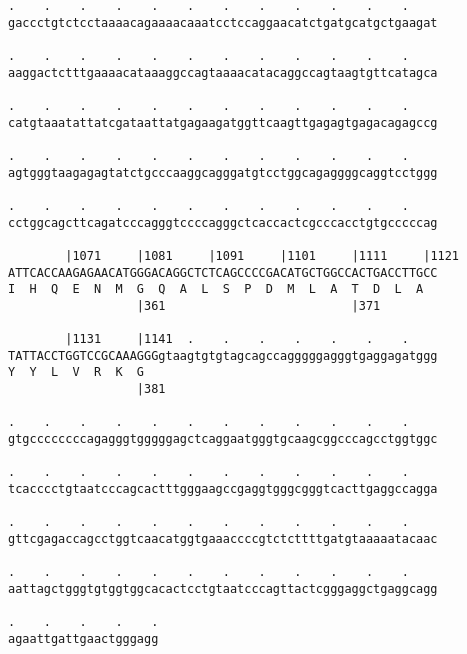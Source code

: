 \documentclass{article}
\begin{document}
\begin{Verbatim}
.    .    .    .    .    .    .    .    .    .    .    .    
gaccctgtctcctaaaacagaaaacaaatcctccaggaacatctgatgcatgctgaagat
                                                            
.    .    .    .    .    .    .    .    .    .    .    .    
aaggactctttgaaaacataaaggccagtaaaacatacaggccagtaagtgttcatagca
                                                            
.    .    .    .    .    .    .    .    .    .    .    .    
catgtaaatattatcgataattatgagaagatggttcaagttgagagtgagacagagccg
                                                            
.    .    .    .    .    .    .    .    .    .    .    .    
agtgggtaagagagtatctgcccaaggcagggatgtcctggcagaggggcaggtcctggg
                                                            
.    .    .    .    .    .    .    .    .    .    .    .    
cctggcagcttcagatcccagggtccccagggctcaccactcgcccacctgtgcccccag
                                                            
        |1071     |1081     |1091     |1101     |1111     |1121
ATTCACCAAGAGAACATGGGACAGGCTCTCAGCCCCGACATGCTGGCCACTGACCTTGCC
I  H  Q  E  N  M  G  Q  A  L  S  P  D  M  L  A  T  D  L  A  
                  |361                          |371        
  
        |1131     |1141  .    .    .    .    .    .    .    
TATTACCTGGTCCGCAAAGGGgtaagtgtgtagcagccagggggagggtgaggagatggg
Y  Y  L  V  R  K  G                                         
                  |381                                      
  
.    .    .    .    .    .    .    .    .    .    .    .    
gtgccccccccagagggtgggggagctcaggaatgggtgcaagcggcccagcctggtggc
                                                            
.    .    .    .    .    .    .    .    .    .    .    .    
tcacccctgtaatcccagcactttgggaagccgaggtgggcgggtcacttgaggccagga
                                                            
.    .    .    .    .    .    .    .    .    .    .    .    
gttcgagaccagcctggtcaacatggtgaaaccccgtctcttttgatgtaaaaatacaac
                                                            
.    .    .    .    .    .    .    .    .    .    .    .    
aattagctgggtgtggtggcacactcctgtaatcccagttactcgggaggctgaggcagg
                                                            
.    .    .    .    .
agaattgattgaactgggagg
                     

\end{Verbatim}
\end{document}
